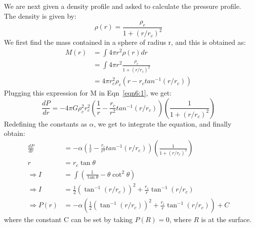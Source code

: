 \documentclass{article}
\begin{document}
We are next given a density profile and asked to calculate the pressure profile. The density is given by:
\begin{equation}
\rho(r) = \frac{\rho_c}{1+(r/r_c)^2}
\end{equation}
We first find the mass contained in a sphere of radius r, and this is obtained as:
\begin{equation}
\begin{split}
M(r) &= \int 4\pi r^2 \rho(r) dr  \\
&= \int 4\pi r^2 \frac{\rho_c}{1+(r/r_c)^2} \\
&=4\pi r_c^2\rho_c \left(r-r_ctan^{-1}(r/r_c)\right)
\end{split}
\end{equation}
Plugging this expression for M in Eqn~\ref{eqn6:1}, we get:
\begin{equation}
\frac{dP}{dr} = -4\pi G\rho_c^2 r_c^2 \left(\frac{1}{r}-\frac{r_c}{r^2}tan^{-1}(r/r_c)\right)\left(\frac{1}{1+(r/r_c)^2}\right)
\end{equation}
Redefining the constants as $\alpha$, we get to integrate the equation, and finally obtain:
\begin{equation}
\begin{split}
\frac{dP}{dr} &= -\alpha  \left(\frac{1}{r}-\frac{r_c}{r^2}tan^{-1}(r/r_c)\right)\left(\frac{1}{1+(r/r_c)^2}\right) \\
r &=r_c\tan \theta \\
\Rightarrow I &=\int \left(\frac{1}{\tan\theta}-\theta \cot^2\theta\right) \\
\Rightarrow I &= \frac{1}{2}\left(\tan^{-1}(r/r_c)\right)^2+\frac{r_c}{r}\tan^{-1}(r/r_c) \\
\Rightarrow P(r) &= -\alpha\left(\frac{1}{2}\left(\tan^{-1}(r/r_c)\right)^2+\frac{r_c}{r}\tan^{-1}(r/r_c)\right) +C
\end{split}
\end{equation}
where the constant C can be set by taking $P(R) = 0$, where $R$ is at the surface. 
\end{document}
